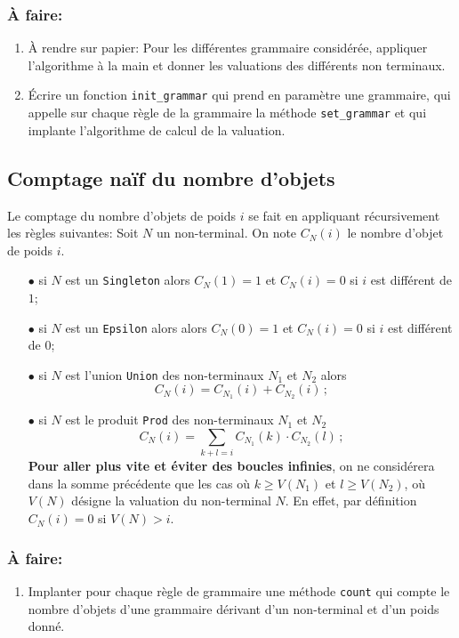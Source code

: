\documentclass[11pt]{article}
\renewcommand{\emph}[1]{\textbf{#1}}
\newcounter{asuivre}
\newenvironment{asks}{\begin{enumerate}\setcounter{enumi}{\theasuivre}}%
                       {\setcounter{asuivre}{\theenumi}\end{enumerate}}
\begin{document}
\subsubsection{À faire:}

\begin{asks}
\item À rendre sur papier: Pour les différentes grammaire considérée, appliquer
  l'algorithme à la main et donner les valuations des différents non
  terminaux.
\item Écrire un fonction \texttt{init\_grammar} qui prend en paramètre une
  grammaire, qui appelle sur chaque règle de la grammaire la méthode
  \verb+set_grammar+ et qui implante l'algorithme de calcul de la valuation. 
\end{asks}

\subsection{Comptage naïf du nombre d'objets}

Le comptage du nombre d'objets de poids $i$ se fait en appliquant
récursivement les règles suivantes:
Soit $N$ un non-terminal. On note $C_N(i)$ le nombre d'objet de poids $i$.
\begin{itemize}
\item[$\bullet$] si $N$ est un \texttt{Singleton} alors $C_N(1) = 1$ et $C_N(i)
  = 0$ si $i$ est différent de $1$;
\item[$\bullet$] si $N$ est un \texttt{Epsilon} alors alors $C_N(0) = 1$ et
  $C_N(i) = 0$ si $i$ est différent de $0$;
\item[$\bullet$] si $N$ est l'union \texttt{Union} des non-terminaux $N_1$ et
  $N_2$ alors
  $$C_N(i) = C_{N_1}(i) + C_{N_2}(i)\,;$$
\item[$\bullet$] si $N$ est le produit \texttt{Prod} des non-terminaux $N_1$ et
  $N_2$
  $$C_N(i) = \sum_{k+l=i} C_{N_1}(k) \cdot C_{N_2}(l)\,;$$
  \emph{Pour aller plus
    vite et éviter des boucles infinies}, on ne considérera dans la somme
  précédente que les cas où $k \geq V(N_1)$ et $l \geq V(N_2)$, où $V(N)$
  désigne la valuation du non-terminal $N$. En effet, par définition
  $C_N(i) = 0$ si $V(N) > i$. 
\end{itemize}

\subsubsection{À faire:}
\begin{asks}
\item Implanter pour chaque règle de grammaire une méthode
  \texttt{count} qui compte le nombre d'objets d'une grammaire dérivant
  d'un non-terminal et d'un poids donné.
\end{asks}
\end{document}
